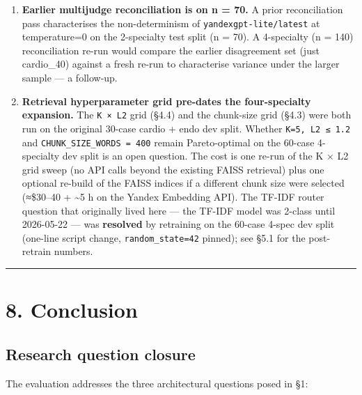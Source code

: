 \documentclass[
  american,
  a4paper,
]{article}
\begin{document}
\begin{enumerate}
  Writing this limitation required accepting the L2 threshold sweep
  result rather than re-running with a wider rejection band: every
  widening that improved Tier 3 catch came at the cost of false
  rejections on Tier 1/2 cases, leaving the original target unmet rather
  than apparently met.
\item
  \textbf{Earlier multijudge reconciliation is on n = 70.} A prior
  reconciliation pass characterises the non-determinism of
  \texttt{yandexgpt-lite/latest} at temperature=0 on the 2-specialty
  test split (n = 70). A 4-specialty (n = 140) reconciliation re-run
  would compare the earlier disagreement set (just cardio\_40) against a
  fresh re-run to characterise variance under the larger sample --- a
  follow-up.
\item
  \textbf{Retrieval hyperparameter grid pre-dates the four-specialty
  expansion.} The \texttt{K\ ×\ L2} grid (§4.4) and the chunk-size grid
  (§4.3) were both run on the original 30-case cardio + endo dev split.
  Whether \texttt{K=5,\ L2\ ≤\ 1.2} and
  \texttt{CHUNK\_SIZE\_WORDS\ =\ 400} remain Pareto-optimal on the
  60-case 4-specialty dev split is an open question. The cost is one
  re-run of the K × L2 grid sweep (no API calls beyond the existing
  FAISS retrieval) plus one optional re-build of the FAISS indices if a
  different chunk size were selected (≈\$30--40 + \textasciitilde5 h on
  the Yandex Embedding API). The TF-IDF router question that originally
  lived here --- the TF-IDF model was 2-class until 2026-05-22 --- was
  \textbf{resolved} by retraining on the 60-case 4-spec dev split
  (one-line script change, \texttt{random\_state=42} pinned); see §5.1
  for the post-retrain numbers.
\end{enumerate}

\begin{center}\rule{0.5\linewidth}{0.5pt}\end{center}

\section{8. Conclusion}\label{conclusion}

\subsection{Research question closure}\label{research-question-closure}

The evaluation addresses the three architectural questions posed in §1:
\end{document}
